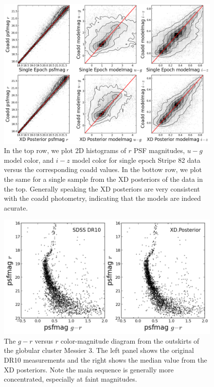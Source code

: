 \documentclass[12pt,preprint]{aastex}
\begin{document}
\begin{figure}
\centering
\includegraphics[width=16cm]{fig4.png}
\caption{In the top row, we plot 2D histograms of $r$ PSF magnitudes, $u-g$
model color, and $i-z$ model color for single epoch Stripe 82 data versus the
corresponding coadd values.  In the bottow row, we plot the same for a single
sample from the XD posteriors of the data in the top.  Generally speaking the
XD posteriors are very consistent with the coadd photometry, indicating that 
the models are indeed acurate.
}
\label{fig:xx_plots}
\end{figure}

\begin{figure}
\centering
\includegraphics[width=16cm]{fig5.png}
\caption{The $g-r$ versus $r$ color-magnitude diagram from the outskirts of
the globular cluster Messier 3.  The left panel shows the original DR10
measurements and the right shows the median value from the XD posteriors.  Note
the main sequence is generally more concentrated, especially at faint
magnitudes.
}
\label{fig:m3}
\end{figure}
\end{document}

